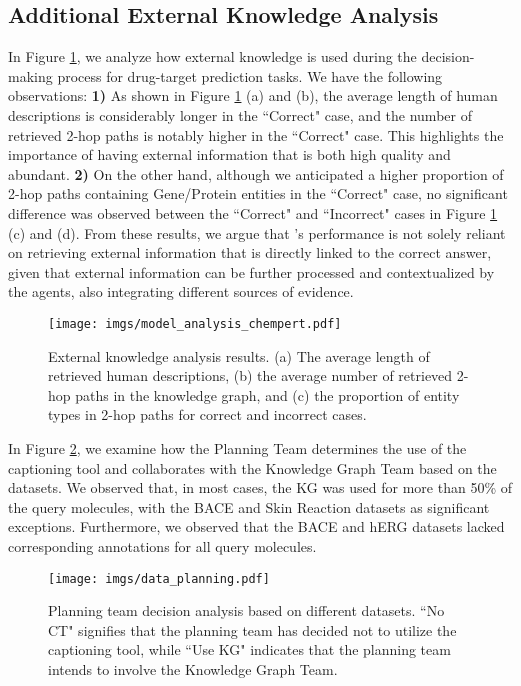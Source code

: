 \subsection{Additional External Knowledge Analysis}
\label{app: additional external knowledge analysis}
In Figure \ref{app fig: model analysis}, we analyze how external knowledge is used during the decision-making process for drug-target prediction tasks.
We have the following observations:
\textbf{1)} As shown in Figure \ref{app fig: model analysis} (a) and (b), the average length of human descriptions is considerably longer in the ``Correct" case, and the number of retrieved 2-hop paths is notably higher in the ``Correct" case. 
This highlights the importance of having external information that is both high quality and abundant.
\textbf{2)} On the other hand, although we anticipated a higher proportion of 2-hop paths containing Gene/Protein entities in the ``Correct" case, no significant difference was observed between the ``Correct" and ``Incorrect" cases in Figure \ref{app fig: model analysis} (c) and (d).
From these results, we argue that \proposed's performance is not solely reliant on retrieving external information that is directly linked to the correct answer, given that external information can be further processed and contextualized by the agents, also integrating different sources of evidence.
\begin{figure}[h]
    \centering
    \texttt{[image: imgs/model\_analysis\_chempert.pdf]}
    \caption{External knowledge analysis results. (a) The average length of retrieved human descriptions, (b) the average number of retrieved 2-hop paths in the knowledge graph, and (c) the proportion of entity types in 2-hop paths for correct and incorrect cases.}
    \label{app fig: model analysis}
\end{figure}

In Figure \ref{app fig: data planning}, we examine how the Planning Team determines the use of the captioning tool and collaborates with the Knowledge Graph Team based on the datasets.
We observed that, in most cases, the KG was used for more than 50\% of the query molecules, with the BACE and Skin Reaction datasets as significant exceptions. 
Furthermore, we observed that the BACE and hERG datasets lacked corresponding annotations for all query molecules.

\begin{figure}[h]
    \centering
    \texttt{[image: imgs/data\_planning.pdf]}
    \caption{Planning team decision analysis based on different datasets. ``No CT" signifies that the planning team has decided not to utilize the captioning tool, while ``Use KG" indicates that the planning team intends to involve the Knowledge Graph Team.}
    \label{app fig: data planning}
\end{figure}

